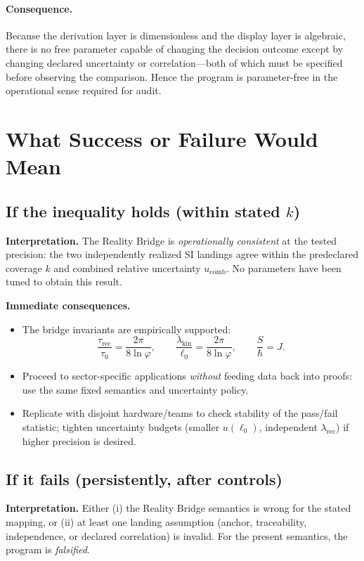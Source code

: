 \documentclass[11pt]{article}
\begin{document}
\paragraph{Consequence.}
Because the derivation layer is dimensionless and the display layer is algebraic, there is no free parameter capable of changing the decision outcome except by changing declared uncertainty or correlation—both of which must be specified before observing the comparison. Hence the program is parameter-free in the operational sense required for audit.

\section{What Success or Failure Would Mean}

\subsection*{If the inequality holds (within stated \(k\))}
\textbf{Interpretation.} The Reality Bridge is \emph{operationally consistent} at the tested precision: the two independently realized SI landings agree within the predeclared coverage \(k\) and combined relative uncertainty \(u_{\mathrm{comb}}\). No parameters have been tuned to obtain this result.

\textbf{Immediate consequences.}
\begin{itemize}
  \item The bridge invariants are empirically supported:
  \[
  \frac{\tau_{\mathrm{rec}}}{\tau_{0}}=\frac{2\pi}{8\ln\varphi},\qquad
  \frac{\lambda_{\mathrm{kin}}}{\ell_{0}}=\frac{2\pi}{8\ln\varphi},\qquad
  \frac{S}{\hbar}=J.
  \]
  \item Proceed to sector-specific applications \emph{without} feeding data back into proofs: use the same fixed semantics and uncertainty policy.
  \item Replicate with disjoint hardware/teams to check stability of the pass/fail statistic; tighten uncertainty budgets (smaller \(u(\ell_{0})\), independent \(\lambda_{\mathrm{rec}}\)) if higher precision is desired.
\end{itemize}

\subsection*{If it fails (persistently, after controls)}
\textbf{Interpretation.} Either (i) the Reality Bridge semantics is wrong for the stated mapping, or (ii) at least one landing assumption (anchor, traceability, independence, or declared correlation) is invalid. For the present semantics, the program is \emph{falsified}.
\end{document}
